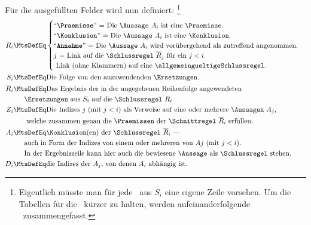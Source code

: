 Für die ausgefüllten Felder wird nun definiert:%
\footnote{%
	Eigentlich müsste man für jede \Ersetzung\ aus $S_i$ eine eigene Zeile vorsehen.
	Um die Tabellen für die \Beweise\ kürzer zu halten, werden aufeinanderfolgende \Ersetzungen\ zusammengefasst.
}
\begin{align}
	R_i & \MtsDefEq
	\begin{cases}
		\text{\strqt{\Praemisse}  = Die \Aussage\ $A_i$ ist eine \Praemisse.}\\
		\text{\strqt{\Konklusion} = Die \Aussage\ $A_i$ ist eine \Konklusion.}\\
		\text{\strqt{Annahme}     = Die \Aussage\ $A_i$ wird vorübergehend als zutreffend angenommen.}\\
		\text{$j$                 = Link auf die \Schlussregel\ $\overline{R}_j$ für ein $j < i$.}\\
		\text{                      Link (ohne Klammern) auf eine \allgemeingueltigeSchlussregel.}
	\end{cases}
	\\
	S_i & \MtsDefEq \text{Die Folge von den anzuwendenden \Ersetzungen.}
	\\
	\overline{R}_i & \MtsDefEq \text{Das Ergebnis der in der angegebenen Reihenfolge angewendeten}\\
	& \quad\;\; \text{\Ersetzungen\ aus $S_i$ auf die \Schlussregel\ $R_i$}
	\\
	Z_i & \MtsDefEq \text{Die Indizes $j$ (mit $j < i$) als Verweise auf eine oder mehrere \Aussagen\ $A_j$,}\\
	& \quad\;\;\text{ welche zusammen genau die \Praemissen\ der \Schnittregel\ } \overline{R}_i \text{ erfüllen.}
	\\
	A_i & \MtsDefEq \text{\Konklusion(en) der \Schlussregel\ $\overline{R}_i$ ---}\\
	& \quad\;\; \text{auch in Form der Indizes von einem oder mehreren von $Aj$ (mit $j < i$).}\\
	& \quad\;\; \text{In der Ergebniszeile kann hier auch die bewiesene \Aussage\ als \Schlussregel\ stehen.}
	\\
	D_i & \MtsDefEq \text{die Indizes der $A_j$, von denen $A_i$ abhängig ist.}
\end{align}

